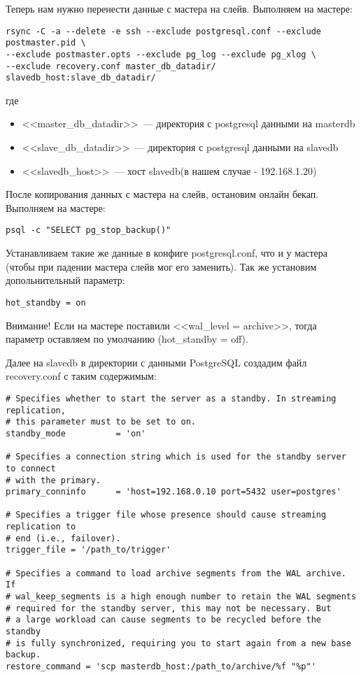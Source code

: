 Теперь нам нужно перенести данные с мастера на слейв. Выполняем на мастере:
\begin{lstlisting}[label=lst:streaming11,caption=Выполняем на мастере]
rsync -C -a --delete -e ssh --exclude postgresql.conf --exclude postmaster.pid \
--exclude postmaster.opts --exclude pg_log --exclude pg_xlog \
--exclude recovery.conf master_db_datadir/ slavedb_host:slave_db_datadir/ 
\end{lstlisting}
где
\begin{itemize}
\item <<master\_db\_datadir>>~--- директория с postgresql данными на masterdb
\item <<slave\_db\_datadir>>~--- директория с postgresql данными на slavedb
\item <<slavedb\_host>>~--- хост slavedb(в нашем случае - 192.168.1.20)
\end{itemize}

После копирования данных с мастера на слейв, остановим онлайн бекап. Выполняем на мастере:
\begin{lstlisting}[label=lst:streaming12,caption=Выполняем на мастере]
psql -c "SELECT pg_stop_backup()"
\end{lstlisting}

Устанавливаем такие же данные в конфиге postgresql.conf, что и у мастера (чтобы при падении мастера слейв мог его заменить). 
Так же установим допольнительный параметр:
\begin{lstlisting}[label=lst:streaming13,caption=Конфиг слейва]
hot_standby = on
\end{lstlisting}
Внимание! Если на мастере поставили <<wal\_level = archive>>, тогда параметр оставляем по умолчанию (hot\_standby = off).

Далее на slavedb в директории с данными PostgreSQL создадим файл recovery.conf с таким содержимым:
\begin{lstlisting}[label=lst:streaming14,caption=Конфиг recovery.conf]
# Specifies whether to start the server as a standby. In streaming replication,
# this parameter must to be set to on.
standby_mode          = 'on'

# Specifies a connection string which is used for the standby server to connect
# with the primary.
primary_conninfo      = 'host=192.168.0.10 port=5432 user=postgres'

# Specifies a trigger file whose presence should cause streaming replication to
# end (i.e., failover).
trigger_file = '/path_to/trigger'

# Specifies a command to load archive segments from the WAL archive. If
# wal_keep_segments is a high enough number to retain the WAL segments
# required for the standby server, this may not be necessary. But
# a large workload can cause segments to be recycled before the standby
# is fully synchronized, requiring you to start again from a new base backup.
restore_command = 'scp masterdb_host:/path_to/archive/%f "%p"'
\end{lstlisting}

